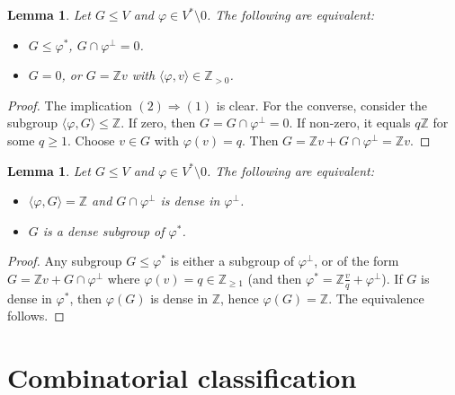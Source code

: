 \documentclass[12pt,reqno]{amsart}
\newcommand{\Z}{{\mathbb Z}}
\theoremstyle{plain}
\newtheorem{lem}[thm]{Lemma}
\theoremstyle{definition}
\theoremstyle{remark}
\begin{document}
\begin{lem}\label{ca}
Let $G\le V$ and $\varphi\in V^*\setminus 0$. The following are equivalent:
\begin{itemize}
\item[(1)] $G\le \varphi^*$, $G\cap \varphi^\perp=0$.
\item[(2)] $G=0$, or $G=\Z v$ with $\langle \varphi,v\rangle\in \Z_{>0}$.
\end{itemize}
\end{lem}

\begin{proof} The implication $(2)\Longrightarrow (1)$ is clear.
	For the converse, consider the subgroup $\langle \varphi,G\rangle\le \Z$. If zero, then $G=G\cap \varphi^\perp=0$. If non-zero, it equals $q\Z$ for some $q\ge 1$. Choose $v\in G$ with $\varphi(v)=q$. Then 
	$G=\Z v+G\cap \varphi^\perp=\Z v$.
\end{proof}

\begin{lem}\label{cd}
Let $G\le V$ and $\varphi \in V^*\setminus 0$. The following
are equivalent:
\begin{itemize}
\item[(1)] $\langle \varphi,G\rangle=\Z$ and $G\cap \varphi^\perp$ is dense in $\varphi^\perp$.
\item[(2)] $G$ is a dense subgroup of $\varphi^*$.
\end{itemize}
\end{lem}

\begin{proof} Any subgroup $G\le \varphi^*$ is either a 
	subgroup of $\varphi^\perp$, or of the form $G=\Z v+G\cap \varphi^\perp$ where $\varphi(v)=q\in \Z_{\ge 1}$ (and then $\varphi^*=\Z\frac{v}{q}+\varphi^\perp$). If $G$ is dense in $\varphi^*$, then $\varphi(G)$ is dense in $\Z$, hence 
	$\varphi(G)=\Z$. The equivalence follows.
\end{proof}


\section{Combinatorial classification}

\end{document}
